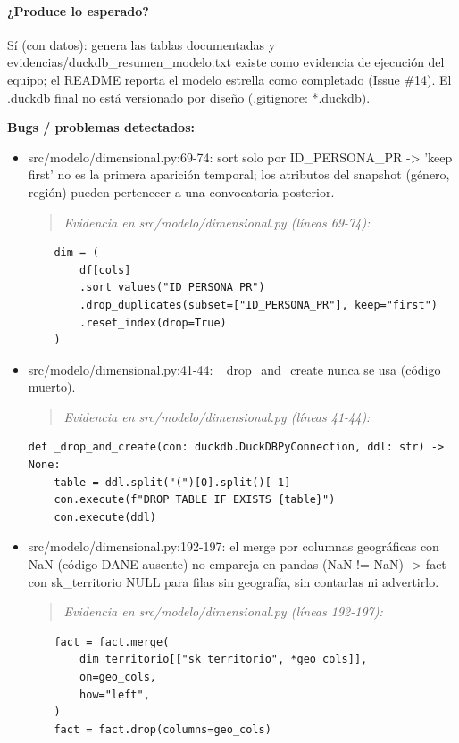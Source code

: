 \paragraph{¿Produce lo esperado?}
Sí (con datos): genera las tablas documentadas y evidencias/duckdb\_resumen\_modelo.txt existe como evidencia de ejecución del equipo; el README reporta el modelo estrella como completado (Issue \#14). El .duckdb final no está versionado por diseño (.gitignore: *.duckdb).

\begin{tcolorbox}[riesgo]
\textbf{Bugs / problemas detectados:}
\begin{itemize}
  \item src/modelo/dimensional.py:69-74: sort solo por ID\_PERSONA\_PR -> 'keep first' no es la primera aparición temporal; los atributos del snapshot (género, región) pueden pertenecer a una convocatoria posterior.
\begin{quote}\footnotesize\ttfamily
\noindent\emph{Evidencia en src/modelo/dimensional.py (líneas 69-74):}
\end{quote}
\begin{lstlisting}
    dim = (
        df[cols]
        .sort_values("ID_PERSONA_PR")
        .drop_duplicates(subset=["ID_PERSONA_PR"], keep="first")
        .reset_index(drop=True)
    )
\end{lstlisting}

  \item src/modelo/dimensional.py:41-44: \_drop\_and\_create nunca se usa (código muerto).
\begin{quote}\footnotesize\ttfamily
\noindent\emph{Evidencia en src/modelo/dimensional.py (líneas 41-44):}
\end{quote}
\begin{lstlisting}
def _drop_and_create(con: duckdb.DuckDBPyConnection, ddl: str) -> None:
    table = ddl.split("(")[0].split()[-1]
    con.execute(f"DROP TABLE IF EXISTS {table}")
    con.execute(ddl)
\end{lstlisting}

  \item src/modelo/dimensional.py:192-197: el merge por columnas geográficas con NaN (código DANE ausente) no empareja en pandas (NaN != NaN) -> fact con sk\_territorio NULL para filas sin geografía, sin contarlas ni advertirlo.
\begin{quote}\footnotesize\ttfamily
\noindent\emph{Evidencia en src/modelo/dimensional.py (líneas 192-197):}
\end{quote}
\begin{lstlisting}
    fact = fact.merge(
        dim_territorio[["sk_territorio", *geo_cols]],
        on=geo_cols,
        how="left",
    )
    fact = fact.drop(columns=geo_cols)
\end{lstlisting}


\end{itemize}
\end{tcolorbox}
